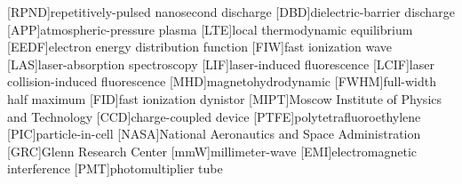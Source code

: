 [RPND]{repetitively-pulsed nanosecond discharge}
[DBD]{dielectric-barrier discharge}
[APP]{atmospheric-pressure plasma}
[LTE]{local thermodynamic equilibrium}
[EEDF]{electron energy distribution function}
[FIW]{fast ionization wave}
[LAS]{laser-absorption spectroscopy}
[LIF]{laser-induced fluorescence}
[LCIF]{laser collision-induced fluorescence}
[MHD]{magnetohydrodynamic}
[FWHM]{full-width half maximum}
[FID]{fast ionization dynistor}
[MIPT]{Moscow Institute of Physics and Technology}
[CCD]{charge-coupled device}
[PTFE]{polytetrafluoroethylene}
[PIC]{particle-in-cell}
[NASA]{National Aeronautics and Space Administration}
[GRC]{Glenn Research Center}
[mmW]{millimeter-wave}
[EMI]{electromagnetic interference}
[PMT]{photomultiplier tube}

